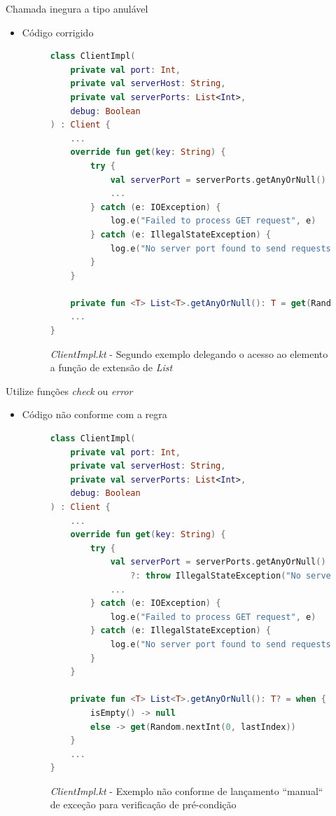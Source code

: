 \documentclass[brazilian]{beamer}
\begin{document}
\begin{frame}[fragile]{Chamada inegura a tipo anulável}
    \begin{itemize}
        \item Código corrigido
        \begin{figure}[H]
            \centering
            \begin{lstlisting}[language=Kotlin]
class ClientImpl(
    private val port: Int,
    private val serverHost: String,
    private val serverPorts: List<Int>,
    debug: Boolean
) : Client {
    ...
    override fun get(key: String) {
        try {
            val serverPort = serverPorts.getAnyOrNull()
            ...
        } catch (e: IOException) {
            log.e("Failed to process GET request", e)
        } catch (e: IllegalStateException) {
            log.e("No server port found to send requests", e)
        }
    }

    private fun <T> List<T>.getAnyOrNull(): T = get(Random.nextInt(lastIndex))
    ...
}
            \end{lstlisting}
            \caption{\textit{ClientImpl.kt} - Segundo exemplo delegando o acesso ao elemento a função de extensão de \textit{List}}
            \label{fig:detekt_unsafe_null_call_on_nullable_after_second_example}
        \end{figure}
    \end{itemize}
\end{frame}

\begin{frame}[fragile]{Utilize funções \textit{check} ou \textit{error}}
    \begin{itemize}
        \item Código não conforme com a regra
        \begin{figure}[H]
            \centering
            \begin{lstlisting}[language=Kotlin]
class ClientImpl(
    private val port: Int,
    private val serverHost: String,
    private val serverPorts: List<Int>,
    debug: Boolean
) : Client {
    ...
    override fun get(key: String) {
        try {
            val serverPort = serverPorts.getAnyOrNull() 
                ?: throw IllegalStateException("No server port found to send request")
            ...
        } catch (e: IOException) {
            log.e("Failed to process GET request", e)
        } catch (e: IllegalStateException) {
            log.e("No server port found to send requests", e)
        }
    }

    private fun <T> List<T>.getAnyOrNull(): T? = when {
        isEmpty() -> null
        else -> get(Random.nextInt(0, lastIndex))
    }
    ...
}
            \end{lstlisting}
            \caption{\textit{ClientImpl.kt} - Exemplo não conforme de lançamento ``manual`` de exceção para verificação de pré-condição}
            \label{fig:detekt_use_error_or_check_before_example}
        \end{figure}
    \end{itemize}
\end{frame}
\end{document}
